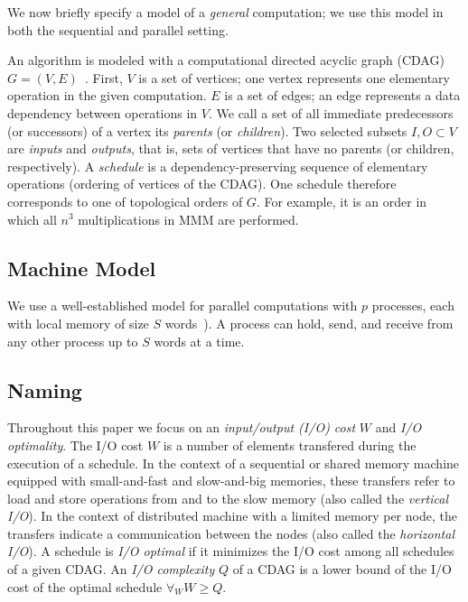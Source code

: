 \documentclass[sigplan,review,anonymous]{acmart}\settopmatter{printfolios=true,printccs=false,printacmref=false}
\begin{document}
We now briefly specify a model of a \emph{general} computation; we use this
model in both the sequential and parallel setting.

An algorithm is modeled with a computational directed acyclic graph 
(CDAG) $G=(V,E)$~\cite{completeRegisterProblems,pebblegameregister, 
registerpebblecolor}.
First, $V$ is a set of
vertices; one vertex represents one elementary operation in the given
computation. $E$ is a
set of edges; an edge represents a data dependency between operations in
$V$. We call a set of all immediate predecessors (or successors) of a vertex 
its \emph{parents} (or \emph{children}). 
Two selected subsets $I, O \subset V$ are \emph{inputs} and \emph{outputs}, 
that is, sets of vertices that have no parents (or children, 
respectively).
%
A \emph{schedule} is a dependency-preserving sequence of 
elementary operations (ordering of vertices of the CDAG). One schedule 
therefore 
corresponds to one of topological orders of $G$. For example, it is an 
order 
in which all $n^3$ multiplications in MMM are performed.

\subsection{Machine Model}

We use a well-established model for parallel computations with $p$
processes, each with local memory of size $S$ words~\cite{CARMA,25d}).
A process can hold, send, and receive from any other process up to $S$ words at 
a time. 

\subsection{Naming}
%
Throughout this paper we focus on an \emph{input/output (I/O) cost} $W$ and 
\emph{I/O 
optimality}. 
The 
I/O cost $W$ is a number of elements transfered during the execution 
of a schedule. In the context of a sequential or shared memory machine equipped 
with small-and-fast and slow-and-big memories, these transfers refer to load 
and store operations from and to the slow memory (also called the 
\emph{vertical 
I/O}). In the context of distributed machine with a limited memory per node, 
the 
transfers indicate a communication between the nodes (also called the
\emph{horizontal I/O}). A schedule is \emph{I/O optimal} if it minimizes the 
I/O cost among all schedules of a given CDAG. An \emph{I/O complexity} $Q$ of a 
CDAG is a lower bound of the I/O cost of the optimal schedule $\forall_W W \ge 
Q$.
\end{document}
